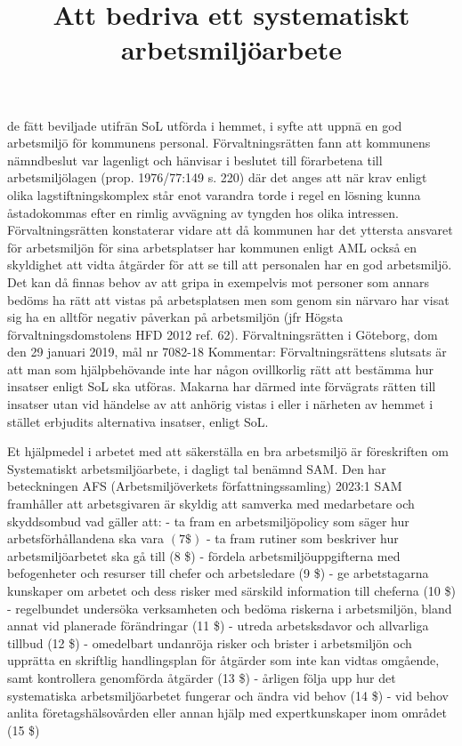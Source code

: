 de fātt beviljade utifrān SoL utförda i hemmet, i syfte att uppnā en god arbetsmiljō för kommunens personal. Förvaltningsrätten fann att kommunens nämndbeslut var lagenligt och hänvisar i beslutet till förarbetena till arbetsmiljölagen (prop. 1976/77:149 s. 220) där det anges att när krav enligt olika lagstiftningskomplex står enot varandra torde i regel en lösning kunna åstadokommas efter en rimlig avvägning av tyngden hos olika intressen.
Förvaltningsrätten konstaterar vidare att då kommunen har det yttersta ansvaret för arbetsmiljön för sina arbetsplatser har kommunen enligt AML också en skyldighet att vidta åtgärder för att se till att personalen har en god arbetsmiljö. Det kan då finnas behov av att gripa in exempelvis mot personer som annars bedöms ha rätt att vistas på arbetsplatsen men som genom sin närvaro har visat sig ha en alltför negativ påverkan på arbetsmiljön (jfr Högsta förvaltningsdomstolens HFD 2012 ref. 62). Förvaltningsrätten i Göteborg, dom den 29 januari 2019, mål nr 7082-18
Kommentar: Förvaltningsrättens slutsats är att man som hjälpbehövande inte har någon ovillkorlig rätt att bestämma hur insatser enligt SoL ska utföras. Makarna har därmed inte förvägrats rätten till insatser utan vid händelse av att anhörig vistas i eller i närheten av hemmet i stället erbjudits alternativa insatser, enligt SoL.

\title{
Att bedriva ett systematiskt arbetsmiljöarbete
}
Et hjälpmedel i arbetet med att säkerställa en bra arbetsmiljö är föreskriften om Systematiskt arbetsmiljöarbete, i dagligt tal benämnd SAM. Den har beteckningen AFS (Arbetsmiljöverkets författningssamling) 2023:1
SAM framhåller att arbetsgivaren är skyldig att samverka med medarbetare och skyddsombud vad gäller att:
- ta fram en arbetsmiljöpolicy som säger hur arbetsförhållandena ska vara \((7 \$)\)
- ta fram rutiner som beskriver hur arbetsmiljöarbetet ska gå till (8 \$)
- fördela arbetsmiljöuppgifterna med befogenheter och resurser till chefer och arbetsledare (9 \$)
- ge arbetstagarna kunskaper om arbetet och dess risker med särskild information till cheferna (10 \$)
- regelbundet undersöka verksamheten och bedöma riskerna i arbetsmiljön, bland annat vid planerade förändringar (11 \$)
- utreda arbetsksdavor och allvarliga tillbud (12 \$)
- omedelbart undanröja risker och brister i arbetsmiljön och upprätta en skriftlig handlingsplan för åtgärder som inte kan vidtas omgående, samt kontrollera genomförda åtgärder (13 \$)
- årligen följa upp hur det systematiska arbetsmiljöarbetet fungerar och ändra vid behov (14 \$)
- vid behov anlita företagshälsovården eller annan hjälp med expertkunskaper inom området (15 \$)

